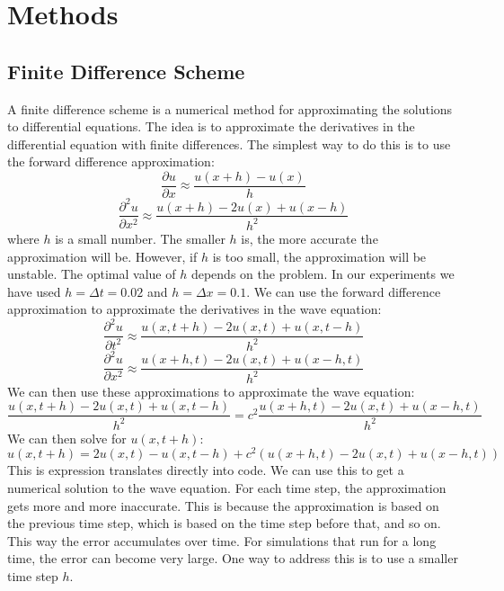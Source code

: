 \documentclass[twoside,11pt]{report}
\begin{document}
\section{Methods}
\label{sec:methods}



\subsection{Finite Difference Scheme}
\label{sec:finite}

    A finite difference scheme is a numerical method for approximating the solutions to differential equations.
    The idea is to approximate the derivatives in the differential equation with finite differences.
    The simplest way to do this is to use the forward difference approximation:
    \begin{equation}
    \frac{\partial u}{\partial x} \approx \frac{u(x+h) - u(x)}{h}
    \end{equation}
    \begin{equation}
    \frac{\partial^2 u}{\partial x^2} \approx \frac{u(x+h) - 2u(x) + u(x-h)}{h^2}
    \end{equation}
    where $h$ is a small number. The smaller $h$ is, the more accurate the approximation will be.
    However, if $h$ is too small, the approximation will be unstable. The optimal value of $h$ depends
    on the problem. In our experiments we have used $h=\Delta t=0.02$ and $h=\Delta x=0.1$.
    We can use the forward difference approximation to approximate the derivatives in the wave equation:
    \begin{equation}
    \frac{\partial^2 u}{\partial t^2} \approx \frac{u(x,t+h) - 2u(x,t) + u(x,t-h)}{h^2}
    \end{equation}
    \begin{equation}
    \frac{\partial^2 u}{\partial x^2} \approx \frac{u(x+h,t) - 2u(x,t) + u(x-h,t)}{h^2}
    \end{equation}
    We can then use these approximations to approximate the wave equation:
    \begin{equation}
    \frac{u(x,t+h) - 2u(x,t) + u(x,t-h)}{h^2} = c^2 \frac{u(x+h,t) - 2u(x,t) + u(x-h,t)}{h^2}
    \end{equation}
    We can then solve for $u(x,t+h)$:
    \begin{equation}
    u(x,t+h) = 2u(x,t) - u(x,t-h) + c^2(u(x+h,t) - 2u(x,t) + u(x-h,t))
    \end{equation}
    This is expression translates directly into code. We can use this to get a numerical solution to the wave equation.
    For each time step, the approximation gets more and more inaccurate. This is because the approximation is based on
    the previous time step, which is based on the time step before that, and so on. This way the error accumulates
    over time. For simulations that run for a long time, the error can become very large. One way to address this
    is to use a smaller time step $h$.
\end{document}
